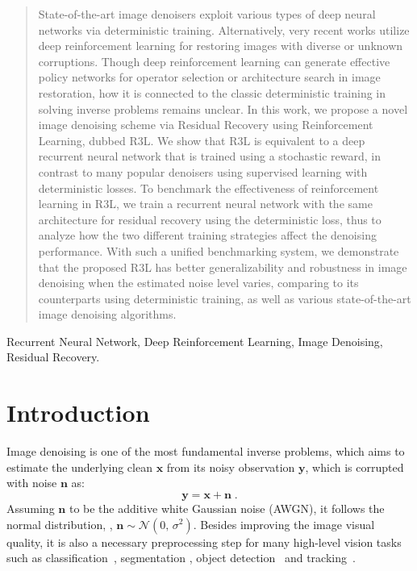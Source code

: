 \documentclass{article}
\begin{document}
\ninept
\maketitle
\begin{abstract}
State-of-the-art image denoisers exploit various types of deep neural networks via deterministic training. Alternatively, very recent works utilize deep reinforcement learning for restoring images with diverse or unknown corruptions. Though deep reinforcement learning can generate effective policy networks for operator selection or architecture search in image restoration, how it is connected to the classic deterministic training in solving inverse problems remains unclear. In this work, we propose a novel image denoising scheme via Residual Recovery using Reinforcement Learning, dubbed R3L. We show that R3L is equivalent to a deep recurrent neural network that is trained using a stochastic reward, in contrast to many popular denoisers using supervised learning with deterministic losses. To benchmark the effectiveness of reinforcement learning in R3L, we train a recurrent neural network with the same architecture for residual recovery  using the deterministic loss, thus to analyze how the two different training strategies affect the denoising performance. With such a unified benchmarking system, we demonstrate that the proposed R3L has better generalizability and robustness in image denoising when the estimated noise level varies, comparing to its counterparts using deterministic training, as well as various state-of-the-art image denoising algorithms. 
\end{abstract}
\begin{keywords}
Recurrent Neural Network, Deep Reinforcement Learning, Image Denoising, Residual Recovery.
\end{keywords}
\section{Introduction}

Image denoising is one of the most fundamental inverse problems, which aims to estimate the underlying clean $\mathbf{x}$ from its noisy observation $\mathbf{y}$, which is corrupted with noise $\mathbf{n}$ as:
\begin{equation}
    \mathbf{y} = \mathbf{x} + \mathbf{n}\;.
\end{equation}
Assuming $\mathbf{n}$ to be the additive white Gaussian noise (AWGN), it follows the normal distribution, \ie,  $\mathbf{n} \sim \mathcal{N}(0,\,\sigma^{2})$. Besides improving the image visual quality, it is also a necessary preprocessing step for many high-level vision tasks such as classification~\cite{liu2018image}, segmentation \cite{liu2020connecting}, object detection~\cite{milyaev2017towards} and tracking~\cite{na2019mixture}. 
\end{document}
